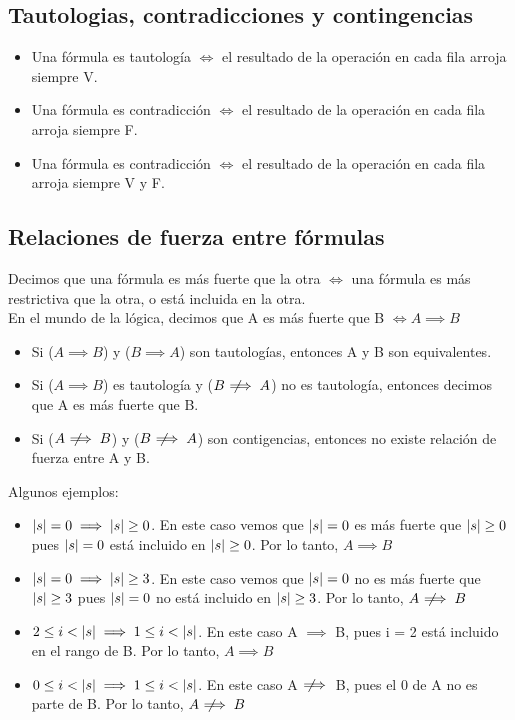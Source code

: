 \documentclass[10pt,a4paper]{article}
\newcommand{\notimplies}{\;\not\!\!\!\implies}
\begin{document}
\subsection*{Tautologias, contradicciones y contingencias}
\begin{itemize}
    \item Una fórmula es tautología \(\iff\) el resultado de la operación en cada fila arroja siempre V.
    \item Una fórmula es contradicción \(\iff\) el resultado de la operación en cada fila arroja siempre F.
    \item  Una fórmula es contradicción \(\iff\) el resultado de la operación en cada fila arroja siempre V y F.
\end{itemize}

\subsection*{Relaciones de fuerza entre fórmulas}
Decimos que una fórmula es más fuerte que la otra \(\iff\) una fórmula es más restrictiva que la otra, o está incluida en la otra. \\
En el mundo de la lógica, decimos que A es más fuerte que B \(\iff A \implies B\)

\begin{itemize}
    \item Si (\(A \implies B\)) y (\(B \implies A\)) son tautologías, entonces A y B son equivalentes.
    \item Si (\(A \implies B\)) es tautología y (\(B \notimplies A\)) no es tautología, entonces decimos que A es más fuerte que B.
    \item Si (\(A \notimplies B\)) y (\(B \notimplies A\)) son contigencias, entonces no existe relación de fuerza entre A y B.
\end{itemize}

Algunos ejemplos:

\begin{itemize}
    \item \(|s| = 0 \implies |s| \ge 0\). En este caso vemos que \(|s| = 0\) es más fuerte que \(|s| \ge 0\) pues \(|s| = 0\) está incluido en \(|s| \ge 0\). Por lo tanto, \(A \implies B\)
    \item \(|s| = 0 \implies |s| \ge 3\). En este caso vemos que \(|s| = 0\) no es más fuerte que \(|s| \ge 3\) pues \(|s| = 0\) no está incluido en \(|s| \ge 3\). Por lo tanto, \(A \notimplies B\)
    \item \(2 \le i < |s| \implies 1 \le i < |s|\). En este caso A \(\implies\) B, pues i = 2 está incluido en el rango de B. Por lo tanto, \(A \implies B\)
    \item \(0 \le i < |s| \implies 1 \le i < |s|\). En este caso A \(\notimplies\) B, pues el 0 de A no es parte de B. Por lo tanto, \(A \notimplies B\)
\end{itemize}
\end{document}
